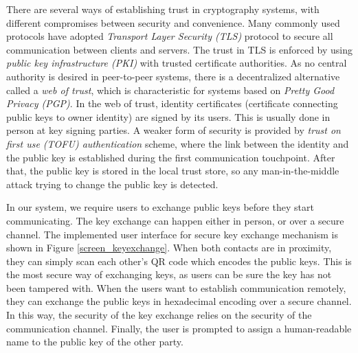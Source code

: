 There are several ways of establishing trust in cryptography systems, with different compromises between security and convenience. Many commonly used protocols have adopted \textit{Transport Layer Security (TLS)} protocol to secure all communication between clients and servers. The trust in TLS is enforced by using \textit{public key infrastructure (PKI)} with trusted certificate authorities. As no central authority is desired in peer-to-peer systems, there is a decentralized alternative called a \textit{web of trust}, which is characteristic for systems based on \textit{Pretty Good Privacy (PGP)}. In the web of trust, identity certificates (certificate connecting public keys to owner identity) are signed by its users. This is usually done in person at key signing parties. A weaker form of security is provided by \textit{trust on first use (TOFU) authentication} scheme, where the link between the identity and the public key is established during the first communication touchpoint. After that, the public key is stored in the local trust store, so any man-in-the-middle attack trying to change the public key is detected.

In our system, we require users to exchange public keys before they start communicating. The key exchange can happen either in person, or over a secure channel. The implemented user interface for secure key exchange mechanism is shown in Figure \ref{screen_keyexchange}. When both contacts are in proximity, they can simply scan each other's QR code which encodes the public keys. This is the most secure way of exchanging keys, as users can be sure the key has not been tampered with. When the users want to establish communication remotely, they can exchange the public keys in hexadecimal encoding over a secure channel. In this way, the security of the key exchange relies on the security of the communication channel. Finally, the user is prompted to assign a human-readable name to the public key of the other party.


